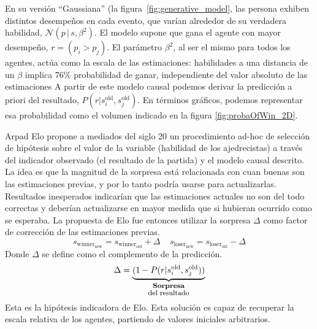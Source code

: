 \documentclass[a4paper,11pt]{book}
\newcommand{\N}{\mathcal{N}}
\newcommand\hfrac[2]{\genfrac{}{}{0pt}{}{#1}{#2}} %
\theoremstyle{definition}
\begin{document}
%
En su versión ``Gaussiana'' (la figura~\ref{fig:generative_model}, las persona exhiben distintos desempe\~nos en cada evento, que varían alrededor de su verdadera habilidad, $\N(p\,|\,s,\beta^2)$.
%
El modelo supone que gana el agente con mayor desempeño, $r = (p_i > p_j)$.
%
El parámetro $\beta^2$, al ser el mismo para todos los agentes, actúa como la escala de las estimaciones: habilidades a una distancia de un $\beta$ implica 76\% probabilidad de ganar, independiente del valor absoluto de las estimaciones%
%
A partir de este modelo causal podemos derivar la predicción a priori del resultado, $P(r|s_i^{\text{old}},s_j^{\text{old}})$.
%
En términos gráficos, podemos representar esa probabilidad como el volumen indicado en la figura \ref{fig:probaOfWin_2D}.


Arpad Elo propone a mediados del siglo 20 un procedimiento ad-hoc de selección de hipótesis sobre el valor de la variable (habilidad de los ajedrecistas) a través del indicador observado (el resultado de la partida) y el modelo causal descrito.
%
La idea es que la magnitud de la sorpresa está relacionada con cuan buenas son las estimaciones previas, y por lo tanto podría usarse para actualizarlas.
%
Resultados inesperados indicarían que las estimaciones actuales no son del todo correctas y deberían actualizarse en mayor medida que si hubieran ocurrido como se esperaba.
%
La propuesta de Elo fue entonces utilizar la sorpresa $\Delta$ como factor de corrección de las estimaciones previas.
%
\begin{equation}\label{eq:elo_update}
 s_{\text{winner}_\text{new}} = s_{\text{winner}_\text{old}} + \Delta \ \ \ \ \ s_{\text{loser}_\text{new}} = s_{\text{loser}_\text{old}} - \Delta
\end{equation}
%
Donde $\Delta$ se define como el complemento de la predicción.
%
\begin{equation*}
 \Delta = \underbrace{(1 - P(r|s_i^{\text{old}},s_j^{\text{old}}))}_{\hfrac{\textbf{\footnotesize Sorpresa}}{\text{\footnotesize del resultado}}}
\end{equation*}
%
Esta es la hipótesis indicadora de Elo.
%
Esta solución es capaz de recuperar la escala relativa de los agentes, partiendo de valores iniciales arbitrarios.
%
\begin{center}
\end{center}
\end{document}
